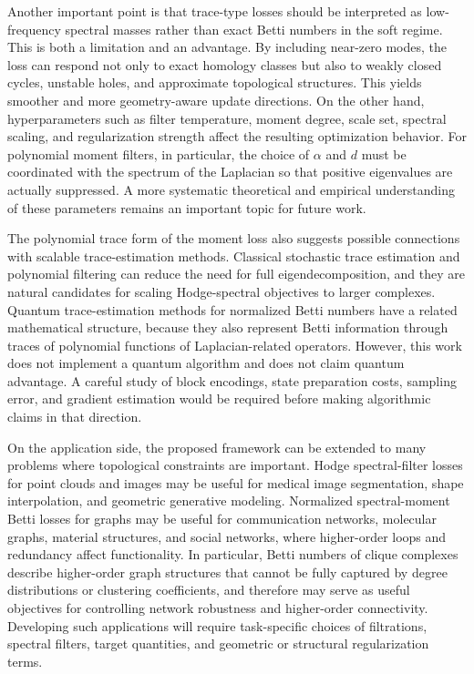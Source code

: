 \documentclass[pdflatex,sn-mathphys-ay]{sn-jnl}%
\theoremstyle{thmstyleone}%
\theoremstyle{thmstyletwo}%
\theoremstyle{thmstylethree}%
\begin{document}
Another important point is that trace-type losses should be interpreted as low-frequency spectral masses rather than exact Betti numbers in the soft regime. This is both a limitation and an advantage. By including near-zero modes, the loss can respond not only to exact homology classes but also to weakly closed cycles, unstable holes, and approximate topological structures. This yields smoother and more geometry-aware update directions. On the other hand, hyperparameters such as filter temperature, moment degree, scale set, spectral scaling, and regularization strength affect the resulting optimization behavior. For polynomial moment filters, in particular, the choice of \(\alpha\) and \(d\) must be coordinated with the spectrum of the Laplacian so that positive eigenvalues are actually suppressed. A more systematic theoretical and empirical understanding of these parameters remains an important topic for future work.

The polynomial trace form of the moment loss also suggests possible connections with scalable trace-estimation methods. Classical stochastic trace estimation and polynomial filtering can reduce the need for full eigendecomposition, and they are natural candidates for scaling Hodge-spectral objectives to larger complexes. Quantum trace-estimation methods for normalized Betti numbers have a related mathematical structure, because they also represent Betti information through traces of polynomial functions of Laplacian-related operators. However, this work does not implement a quantum algorithm and does not claim quantum advantage. A careful study of block encodings, state preparation costs, sampling error, and gradient estimation would be required before making algorithmic claims in that direction.

On the application side, the proposed framework can be extended to many problems where topological constraints are important. Hodge spectral-filter losses for point clouds and images may be useful for medical image segmentation, shape interpolation, and geometric generative modeling. Normalized spectral-moment Betti losses for graphs may be useful for communication networks, molecular graphs, material structures, and social networks, where higher-order loops and redundancy affect functionality. In particular, Betti numbers of clique complexes describe higher-order graph structures that cannot be fully captured by degree distributions or clustering coefficients, and therefore may serve as useful objectives for controlling network robustness and higher-order connectivity.
Developing such applications will require task-specific choices of filtrations, spectral filters, target quantities, and geometric or structural regularization terms.
\end{document}
